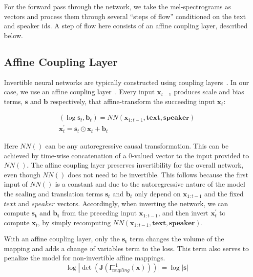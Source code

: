 \documentclass{article}
\begin{document}
For the forward pass through the network, we take the mel-spectrograms as vectors and process them through several ``steps of flow” conditioned on the text and speaker ids. A step of flow here consists of an affine coupling layer, described below.

\subsection{Affine Coupling Layer}
Invertible neural networks are typically constructed using coupling layers~\cite{dinh2014nice, dinh2016density, kingma2018glow}.  In our case, we use an affine coupling layer~\cite{dinh2016density}. Every input $\boldsymbol{x}_{t-1}$ produces scale and bias terms, $\boldsymbol{s}$ and $\boldsymbol{b}$ respectively, that affine-transform the succeeding input $\boldsymbol{x}_{t}$:  

\begin{gather}
(\log \boldsymbol{s}_t, \boldsymbol{b}_t) = NN(\boldsymbol{x}_{1:t-1}, \boldsymbol{text}, \boldsymbol{speaker}) \\
\boldsymbol{x}^\prime_t = \boldsymbol{s}_t \odot \boldsymbol{x}_t + \boldsymbol{b}_t
\end{gather}

Here $NN()$ can be any autoregressive causal transformation. This can be achieved by time-wise concatenation of a 0-valued vector to the input provided to $NN()$. The affine coupling layer preserves invertibility for the overall network, even though $NN()$ does not need to be invertible. This follows because the first input of $NN()$ is a constant and due to the autoregressive nature of the model the scaling and translation terms $\boldsymbol{s}_t$ and $\boldsymbol{b}_t$ only depend on $\boldsymbol{x}_{1:t-1}$ and the fixed $text$ and $speaker$ vectors. Accordingly, when inverting the network, we can compute $\boldsymbol{s_t}$ and $\boldsymbol{b_t}$ from the preceding input $\boldsymbol{x}_{1:t-1}$, and then invert $\boldsymbol{x}^\prime_t$ to compute $\boldsymbol{x}_t$, by simply recomputing $NN(\boldsymbol{x}_{1:t-1}, \boldsymbol{text}, \boldsymbol{speaker})$. 

With an affine coupling layer, only the $\boldsymbol{s_t}$ term changes the volume of the mapping and adds a change of variables term to the loss. This term also serves to penalize the model for non-invertible affine mappings.
\begin{equation}
\log |\det(\boldsymbol{J}(\boldsymbol{f}_{coupling}^{-1}(\boldsymbol{x})))| = \log |\boldsymbol{s}|
\end{equation}
\end{document}
